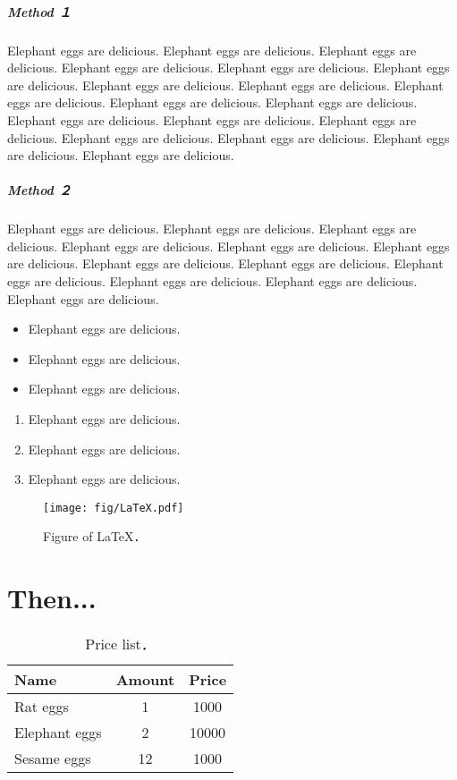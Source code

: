 \documentclass[
  10pt,      %
  a4j,       %
  twocolumn, %
  english,   %
  uplatex,
  dvipdfmx
]{jsarticle}
\begin{document}
\subparagraph{Method １}
Elephant eggs are delicious. Elephant eggs are delicious. Elephant eggs are delicious. Elephant eggs are delicious. Elephant eggs are delicious. Elephant eggs are delicious. Elephant eggs are delicious. Elephant eggs are delicious. Elephant eggs are delicious. Elephant eggs are delicious. Elephant eggs are delicious. Elephant eggs are delicious. Elephant eggs are delicious. Elephant eggs are delicious. Elephant eggs are delicious. Elephant eggs are delicious. Elephant eggs are delicious. Elephant eggs are delicious.

\subparagraph{Method ２}
Elephant eggs are delicious. Elephant eggs are delicious. Elephant eggs are delicious. Elephant eggs are delicious. Elephant eggs are delicious. Elephant eggs are delicious. Elephant eggs are delicious. Elephant eggs are delicious. Elephant eggs are delicious. Elephant eggs are delicious. Elephant eggs are delicious. Elephant eggs are delicious.

\begin{itemize}
    \item Elephant eggs are delicious.
    \item Elephant eggs are delicious.
    \item Elephant eggs are delicious.
\end{itemize}
\begin{enumerate}
    \item Elephant eggs are delicious.
    \item Elephant eggs are delicious.
    \item Elephant eggs are delicious.
\end{enumerate}

\begin{figure}[t]
    \centering
    \texttt{[image: fig/LaTeX.pdf]}
    \caption{Figure of \LaTeX{}．}
    \label{fig:latex}
\end{figure}

\section{Then...}
\begin{table}[t]
    \centering
    \caption{Price list．}
    \label{tab:egg}
    \begin{tabular}{l|cS[table-format=5.0]} %
        \toprule
        Name          & Amount & Price \\
        \midrule
        Rat eggs      & 1      & 1000  \\
        Elephant eggs & 2      & 10000 \\
        Sesame eggs   &	12     & 1000  \\
        \bottomrule
    \end{tabular}
\end{table}
\end{document}
